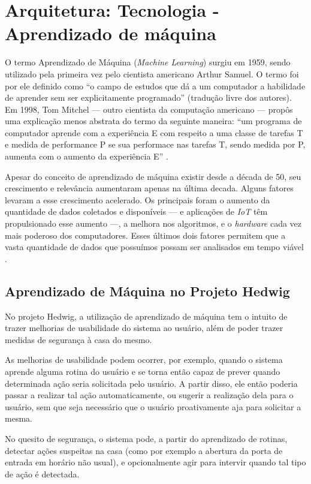 \chapter{Arquitetura: Tecnologia - Aprendizado de máquina}

	O termo Aprendizado de Máquina (\emph{Machine Learning}) surgiu em 1959, sendo utilizado pela primeira vez  pelo cientista americano Arthur Samuel. O termo foi por ele definido como ``o campo de estudos que dá a um computador a habilidade de aprender sem ser explicitamente programado'' (tradução livre dos autores). Em 1998, Tom Mitchel --- outro cientista da computação americano --- propôs uma explicação menos abstrata do termo da seguinte maneira: ``um programa de computador aprende com a experiência E com respeito a uma classe de tarefas T e medida de performance P se sua performace nas tarefas T, sendo medida por P, aumenta com o aumento da experiência E'' \cite{Coursera}.

	Apesar do conceito de aprendizado de máquina existir desde a década de 50, seu crescimento e relevância aumentaram apenas na última decada. Alguns fatores levaram a esse crescimento acelerado. Os principais foram o aumento da quantidade de dados coletados e disponíveis --- e aplicações de \emph{IoT} têm propulsionado esse aumento ---, a melhora nos algoritmos, e o \emph{hardware} cada vez mais poderoso dos computadores. Esses últimos dois fatores permitem que a vasta quantidade de dados que possuímos possam ser analisados em tempo viável \cite{hbrMlExplosion}.

	\section{Aprendizado de Máquina no Projeto Hedwig}

		No projeto Hedwig, a utilização de aprendizado de máquina tem o intuito de trazer melhorias de usabilidade do sistema ao usuário, além de poder trazer medidas de segurança à casa do mesmo.

		As melhorias de usabilidade podem ocorrer, por exemplo, quando o sistema aprende alguma rotina do usuário e se torna então capaz de prever quando determinada ação seria solicitada pelo usuário. A partir disso, ele então poderia passar a realizar tal ação automaticamente, ou sugerir a realização dela para o usuário, sem que seja necessário que o usuário proativamente aja para solicitar a mesma.

		No quesito de segurança, o sistema pode, a partir do aprendizado de rotinas, detectar ações suspeitas na casa (como por exemplo a abertura da porta de entrada em horário não usual), e opcionalmente agir para intervir quando tal tipo de ação é detectada.

